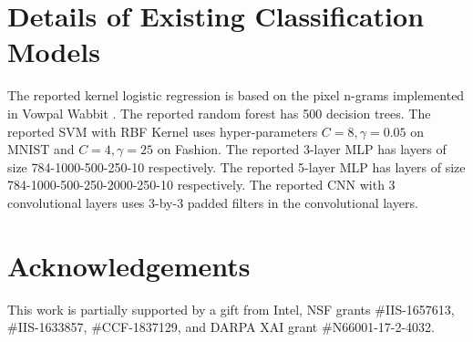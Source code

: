 \documentclass[letterpaper]{article} %
\begin{document}
\section{Details of Existing Classification Models}
\label{s: model details}
   The reported kernel logistic regression is based on the pixel n-grams implemented in Vowpal Wabbit \cite{vw2007}. The reported random forest has 500 decision trees. The reported SVM with RBF Kernel uses hyper-parameters $C=8, \gamma=0.05$ on MNIST and $C=4,\gamma=25$ on Fashion. The reported 3-layer MLP has layers of size 784-1000-500-250-10 respectively. The reported 5-layer MLP has layers of size 784-1000-500-250-2000-250-10 respectively. The reported CNN with 3 convolutional layers uses 3-by-3 padded filters in the convolutional layers.
   

\section*{Acknowledgements}
This work is partially
supported by
a gift from Intel,
NSF grants \#IIS-1657613, \#IIS-1633857, \#CCF-1837129,
and DARPA XAI grant \#N66001-17-2-4032.


\end{document}
